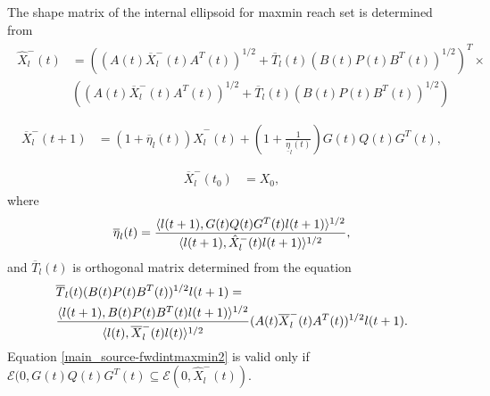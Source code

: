 \documentclass[letterpaper,10pt,english]{sphinxmanual}
\begin{document}
The shape matrix of the internal ellipsoid for maxmin reach set is
determined from
\label{main_source:equation-fwdintmaxmin1}\begin{gather}
\begin{split}\hat{X}^-_l(t) & =
\left((A(t)\overline{X}^-_l(t)A^T(t))^{1/2} +
\overline{T}_l(t)(B(t)P(t)B^T(t))^{1/2}\right)^T
\times \nonumber \\
& \left((A(t)\overline{X}^-_l(t)A^T(t))^{1/2} +
\overline{T}_l(t)(B(t)P(t)B^T(t))^{1/2}\right)\\\end{split}\label{main_source-fwdintmaxmin1}
\end{gather}\label{main_source:equation-fwdintmaxmin2}\begin{gather}
\begin{split}\overline{X}^-_l(t+1) & =
(1+\overline{\eta}_l(t))\hat{X}^-_l(t) +
\left(1+\frac{1}{\underline{\eta}_l(t)}\right)
G(t)Q(t)G^T(t), \\\end{split}\label{main_source-fwdintmaxmin2}
\end{gather}\label{main_source:equation-fwdintmaxmin3}\begin{gather}
\begin{split}\overline{X}^-_l(t_0) & = X_0,\end{split}\label{main_source-fwdintmaxmin3}
\end{gather}
where
\begin{gather}
\begin{split}\overline{\eta}_l(t) = \frac{\langle l(t+1),
G(t)Q(t)G^T(t)l(t+1)\rangle^{1/2}}{\langle l(t+1),
\hat{X}^-_l(t)l(t+1)\rangle^{1/2}},\end{split}\notag
\end{gather}
and $\overline{T}_l(t)$ is orthogonal matrix determined from the
equation
\begin{gather}
\begin{split}\begin{aligned}
& \overline{T}_l(t)(B(t)P(t)B^T(t))^{1/2}l(t+1) = \\
& \frac{\langle l(t+1),
B(t)P(t)B^T(t)l(t+1)\rangle^{1/2}}{\langle l(t),
\overline{X}^-_l(t)l(t)\rangle^{1/2}}(A(t)\overline{X}^-_l(t)A^T(t))^{1/2}l(t+1).\end{aligned}\end{split}\notag
\end{gather}
Equation \eqref{main_source-fwdintmaxmin2} is valid only if
${\mathcal E}(0,G(t)Q(t)G^T(t)\subseteq{\mathcal E}(0,\hat{X}^-_l(t))$.
\end{document}
